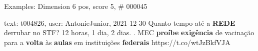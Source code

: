 \begin{frame}{Examples: Dimension 6 pos, score 5, \# 000045}
\footnotesize
\begin{exampleblock}{text: t004826, user: AntonieJunior, 2021-12-30}
Quanto tempo até a \textbf{REDE} derrubar no STF? 12 horas, 1 dia, 2 dias. . 
MEC \textbf{proíbe} \textbf{exigência} de vacinação para a \textbf{volta} às 
\textbf{aulas} em instituições \textbf{federais} https://t.co/wtJzBkfVJA 
\end{exampleblock}
\end{frame}
